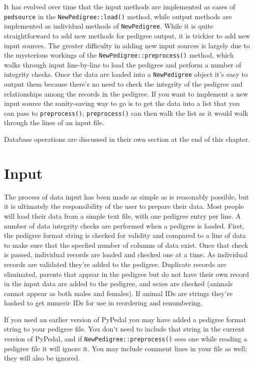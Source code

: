 \documentclass[
  letterpaper,
  DIV=11,
  numbers=noendperiod]{scrreprt}
\begin{document}
It has evolved over time that the input methods are implemented as cases
of \texttt{pedsource} in the \texttt{NewPedigree::load()} method, while
output methods are implemented as individual methods of
\texttt{NewPedigree}. While it is quite straightforward to add new
methods for pedigree output, it is trickier to add new input sources.
The greater difficulty in adding new input sources is largely due to the
mysterious workings of the \texttt{NewPedigree::preprocess()} method,
which walks through input line-by-line to load the pedigree and perform
a number of integrity checks. Once the data are loaded into a
\texttt{NewPedigree} object it's easy to output them because there's no
need to check the integrity of the pedigree and relationships among the
records in the pedigree. If you want to implement a new input source the
sanity-saving way to go is to get the data into a list that you can pass
to \texttt{preprocess()}; \texttt{preprocess()} can then walk the list
as it would walk through the lines of an input file.

Database operations are discussed in their own section at the end of
this chapter.

\section{Input}\label{input}

The process of data input has been made as simple as is reasonably
possible, but it is ultimately the responsibility of the user to prepare
their data. Most people will load their data from a simple text file,
with one pedigree entry per line. A number of data integrity checks are
performed when a pedigree is loaded. First, the pedigree format string
is checked for validity and compared to a line of data to make sure that
the specfied number of columns of data exist. Once that check is passed,
individual records are loaded and checked one at a time. As individual
records are validated they're added to the pedigree. Duplicate records
are eliminated, parents that appear in the pedigree but do not have
their own record in the input data are added to the pedigree, and sexes
are checked (animals cannot appear as both males and females). If animal
IDs are strings they're hashed to get numeric IDs for use in reordering
and renumbering.

If you used an earlier version of PyPedal you may have added a pedigree
format string to your pedigree file. You don't need to include that
string in the current version of PyPedal, and if
\texttt{NewPedigree::preprocess()} sees one while reading a pedigree
file it will ignore it. You may include comment lines in your file as
well; they will also be ignored.
\end{document}
